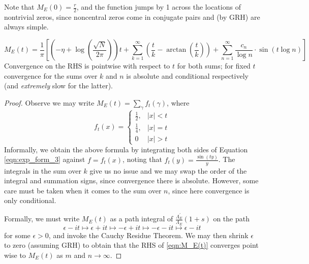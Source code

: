 \documentclass[10pt]{article}
\newcommand{\pr}{^{\prime}}
\newcommand{\ldLam}[1]{\frac{\Lambda_E\pr}{\Lambda_E}\left(#1\right)}
\begin{document}
Note that $M_E(0) = \frac{r}{2}$, and the function jumps by 1 across the locations of nontrivial zeros, since noncentral zeros come in conjugate pairs and (by GRH) are always simple. \\

\begin{proposition}[S.]
\begin{equation}\label{eqn:M_E(t)}
M_E(t) = \frac{1}{\pi}\left[\left(-\eta+\log\left(\frac{\sqrt{N}}{2\pi}\right)\right) t + \sum_{k=1}^{\infty} \left(\frac{t}{k} - \arctan\left(\frac{t}{k}\right)\right) + \sum_{n=1}^{\infty} \frac{c_n}{\log n}\cdot \sin(t\log n)\right]
\end{equation}
Convergence on the RHS is pointwise with respect to $t$ for both sums; for fixed $t$ convergence for the sums over $k$ and $n$ is absolute and conditional respectively (and {\it extremely} slow for the latter).
\end{proposition}

\begin{proof}
Observe we may write $M_E(t) = \sum_{\gamma}f_t(\gamma)$, where
\begin{equation}
f_t(x) = \begin{cases} \frac{1}{2}, & |x|<t \\ \frac{1}{4}, & |x| = t \\ 0 & |x|> t \end{cases}
\end{equation}
Informally, we obtain the above formula by integrating both sides of Equation \ref{eqn:exp_form_3} against $f = f_t(x)$, noting that $\hat{f}_t(y) = \frac{\sin(ty)}{y}$. The integrals in the sum over $k$ give us no issue and we may swap the order of the integral and summation signs, since convergence there is absolute. However, some care must be taken when it comes to the sum over $n$, since here convergence is only conditional. 

Formally, we must write $M_E(t)$ as a path integral of $\ldLam{1+s}$ on the path
\begin{equation*}
\epsilon-it \mapsto \epsilon+it \mapsto -\epsilon+it \mapsto -\epsilon-it \mapsto \epsilon-it
\end{equation*}
for some $\epsilon>0$, and invoke the Cauchy Residue Theorem. We may then shrink $\epsilon$ to zero (assuming GRH) to obtain that the RHS of \ref{eqn:M_E(t)} converges point wise to $M_E(t)$ as $m$ and $n \to \infty$.
\end{proof}
\end{document}

